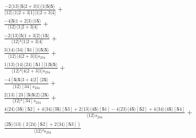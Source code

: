 \documentclass[varwidth, border=5pt]{standalone}
\begin{document}
\begin{my}
$\begin{gathered}
\scriptscriptstyle\frac{-2⟨13⟩[𝟓|2+3|1⟩[1|𝟓|𝟓⟩}{⟨12⟩⟨1|2+3|1]⟨1|2+3|4]} +\\
\scriptscriptstyle\frac{-4[𝟓|1+2|3⟩⟨1𝟓⟩}{⟨12⟩⟨1|2+3|4]} +\\
\scriptscriptstyle\frac{-2⟨13⟩[𝟓|1+3|2⟩⟨1𝟓⟩}{⟨12⟩²⟨1|2+3|4]} +\\
\scriptscriptstyle\frac{3⟨14⟩⟨34⟩[𝟓1][1|𝟓|𝟓⟩}{⟨12⟩⟨4|2+3|1]s_{234}} +\\
\scriptscriptstyle\frac{1⟨13⟩⟨14⟩⟨24⟩[𝟓1][1|𝟓|𝟓⟩}{⟨12⟩²⟨4|2+3|1]s_{234}} +\\
\scriptscriptstyle\frac{-4[𝟓|𝟓|3+4|2]⟨2𝟓⟩}{⟨12⟩[34]s_{234}} +\\
\scriptscriptstyle\frac{2⟨13⟩[23][𝟓|𝟓|2⟩⟨2𝟓⟩}{⟨12⟩²[34]s_{234}} +\\
\scriptscriptstyle\frac{4⟨24⟩⟨3𝟓⟩[𝟓2]+4⟨34⟩⟨3𝟓⟩[𝟓3]+2⟨13⟩⟨4𝟓⟩[𝟓1]-4⟨23⟩⟨4𝟓⟩[𝟓2]+4⟨34⟩⟨4𝟓⟩[𝟓4]}{⟨12⟩s_{234}} +\\
\scriptscriptstyle\frac{⟨2𝟓⟩⟨13⟩(2⟨24⟩[𝟓2]+2⟨34⟩[𝟓3])}{⟨12⟩²s_{234}} \phantom{+}
\end{gathered}$
\end{my}
\end{document}
